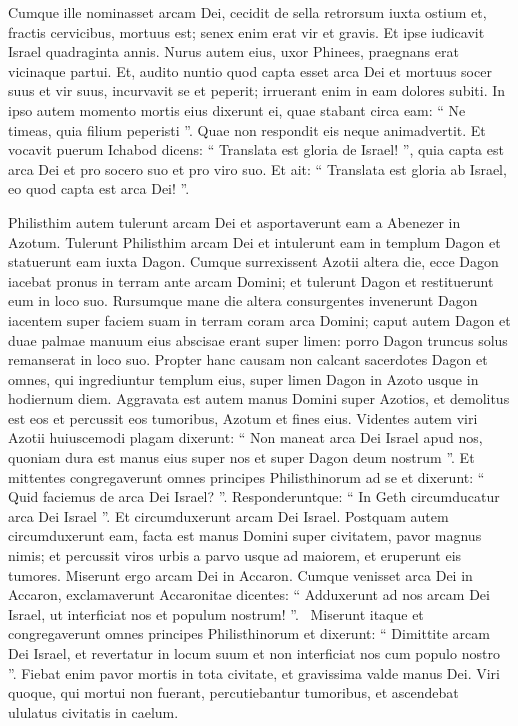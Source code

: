 \begin{biblechapter}
\begin{biblechapter}
\begin{biblechapter}
\begin{biblechapter}
 \verse Cumque ille nominasset arcam Dei, cecidit de sella retrorsum iuxta ostium et, fractis cervicibus, mortuus est; senex enim erat vir et gravis. Et ipse iudicavit Israel quadraginta annis.
 \verse Nurus autem eius, uxor Phinees, praegnans erat vicinaque partui. Et, audito nuntio quod capta esset arca Dei et mortuus socer suus et vir suus, incurvavit se et peperit; irruerant enim in eam dolores subiti. 
\verse In ipso autem momento mortis eius dixerunt ei, quae stabant circa eam: “ Ne timeas, quia filium peperisti ”. Quae non respondit eis neque animadvertit. 
\verse Et vocavit puerum Ichabod dicens: “ Translata est gloria de Israel! ”, quia capta est arca Dei et pro socero suo et pro viro suo. 
\verse Et ait: “ Translata est gloria ab Israel, eo quod capta est arca Dei! ”.
 
\begin{biblechapter}
\verse Philisthim autem tulerunt arcam Dei et asportaverunt eam a Abenezer in Azotum. 
\verse Tulerunt Philisthim arcam Dei et intulerunt eam in templum Dagon et statuerunt eam iuxta Dagon. 
\verse Cumque surrexissent Azotii altera die, ecce Dagon iacebat pronus in terram ante arcam Domini; et tulerunt Dagon et restituerunt eum in loco suo. 
\verse Rursumque mane die altera consurgentes invenerunt Dagon iacentem super faciem suam in terram coram arca Domini; caput autem Dagon et duae palmae manuum eius abscisae erant super limen: 
\verse porro Dagon truncus solus remanserat in loco suo. Propter hanc causam non calcant sacerdotes Dagon et omnes, qui ingrediuntur templum eius, super limen Dagon in Azoto usque in hodiernum diem.
 \verse Aggravata est autem manus Domini super Azotios, et demolitus est eos et percussit eos tumoribus, Azotum et fines eius. 
\verse Videntes autem viri Azotii huiuscemodi plagam dixerunt: “ Non maneat arca Dei Israel apud nos, quoniam dura est manus eius super nos et super Dagon deum nostrum ”. 
\verse Et mittentes congregaverunt omnes principes Philisthinorum ad se et dixerunt: “ Quid faciemus de arca Dei Israel? ”. Responderuntque: “ In Geth circumducatur arca Dei Israel ”. Et circumduxerunt arcam Dei Israel. 
\verse Postquam autem circumduxerunt eam, facta est manus Domini super civitatem, pavor magnus nimis; et percussit viros urbis a parvo usque ad maiorem, et eruperunt eis tumores. 
\verse Miserunt ergo arcam Dei in Accaron.
 Cumque venisset arca Dei in Accaron, exclamaverunt Accaronitae dicentes: “ Adduxerunt ad nos arcam Dei Israel, ut interficiat nos et populum nostrum! ”. 
 \verse Miserunt itaque et congregaverunt omnes principes Philisthinorum et dixerunt: “ Dimittite arcam Dei Israel, et revertatur in locum suum et non interficiat nos cum populo nostro ”. 
\verse Fiebat enim pavor mortis in tota civitate, et gravissima valde manus Dei. Viri quoque, qui mortui non fuerant, percutiebantur tumoribus, et ascendebat ululatus civitatis in caelum.
 

\end{biblechapter}
\end{biblechapter}
\end{biblechapter}
\end{biblechapter}
\end{biblechapter}
